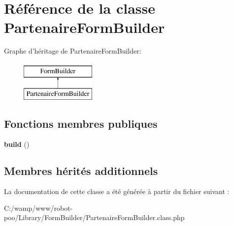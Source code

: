 \hypertarget{class_library_1_1_form_builder_1_1_partenaire_form_builder}{\section{Référence de la classe Partenaire\+Form\+Builder}
\label{class_library_1_1_form_builder_1_1_partenaire_form_builder}
}
Graphe d'héritage de Partenaire\+Form\+Builder\+:\begin{figure}[H]
\begin{center}
\leavevmode
\includegraphics[height=2.000000cm]{class_library_1_1_form_builder_1_1_partenaire_form_builder}
\end{center}
\end{figure}
\subsection*{Fonctions membres publiques}
\begin{DoxyCompactItemize}
\item 
\hypertarget{class_library_1_1_form_builder_1_1_partenaire_form_builder_a3928875ef0ceb18a51c1061be3eb3a00}{{\bfseries build} ()}\label{class_library_1_1_form_builder_1_1_partenaire_form_builder_a3928875ef0ceb18a51c1061be3eb3a00}

\end{DoxyCompactItemize}
\subsection*{Membres hérités additionnels}


La documentation de cette classe a été générée à partir du fichier suivant \+:\begin{DoxyCompactItemize}
\item 
C\+:/wamp/www/robot-\/poo/\+Library/\+Form\+Builder/Partenaire\+Form\+Builder.\+class.\+php\end{DoxyCompactItemize}
